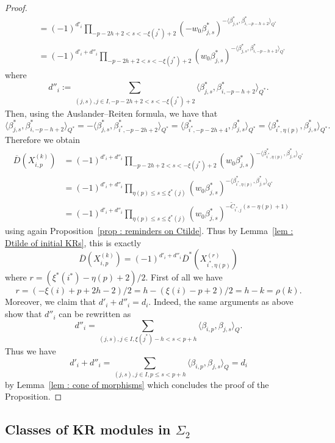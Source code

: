 \documentclass[12pt]{amsart}
\theoremstyle{plain}
\theoremstyle{definition}
\numberwithin{equation}{section}
\newcommand{\barD}{\overline{D}}
\newcommand{\barDstar}{\overline{D}^{*}}
\begin{document}
\begin{proof}
\begin{align*}
  &= (-1)^{d'_i} \prod_{-p-2h+2<s<-\xi(j^{*})+2} \left( - w_0 \beta_{j,s}^{*} \right)^{- \langle   \beta_{j,s}^{*} , \beta_{i,-p-h+2}^{*} \rangle_{Q^{*}} } \\
  &=  (-1)^{d'_i+d''_i} \prod_{-p-2h+2<s<-\xi(j^{*})+2} \left( w_0 \beta_{j,s}^{*} \right)^{- \langle   \beta_{j,s}^{*} , \beta_{i,-p-h+2}^{*} \rangle_{Q^{*}} }
  \end{align*}
  where 
  $$ d''_i := \sum_{(j,s) , j \in I ,-p-2h+2<s<-\xi(j^{*})+2} \langle   \beta_{j,s}^{*} , \beta_{i,-p-h+2}^{*} \rangle_{Q^{*}} .  $$
  Then, using the Auslander--Reiten formula, we have that 
  $$\langle \beta_{j,s}^{*} , \beta_{i,-p-h+2}^{*} \rangle_{Q^{*}} = - \langle   \beta_{j,s}^{*} , \beta_{i^{*},-p-2h+2}^{*} \rangle_{Q^{*}}  = \langle  \beta_{i^{*},-p-2h+4}^{*} , \beta_{j,s}^{*} \rangle_{Q^{*}} = \langle \beta_{i^{*},\eta(p)}^{*} , \beta_{j,s}^{*} \rangle_{Q^{*}} . $$
  Therefore we obtain 
 \begin{align*}
\barD \left( X_{i,p}^{(k)} \right) &= (-1)^{d'_i+d''_i} \prod_{-p-2h+2<s<-\xi(j^{*})+2} \left( w_0 \beta_{j,s}^{*} \right)^{-\langle \beta_{i^{*},\eta(p)}^{*} , \beta_{j,s}^{*} \rangle_{Q^{*}}} \\
&= (-1)^{d'_i + d''_i} \prod_{\eta(p)  \leq s \leq \xi^{*}(j)} \left( w_0 \beta_{j,s}^{*} \right)^{-\langle \beta_{i^{*},\eta(p)}^{*} , \beta_{j,s}^{*} \rangle_{Q^{*}}} \\
&= (-1)^{d'_i + d''_i} \prod_{\eta(p)  \leq s \leq \xi^{*}(j)} \left( w_0 \beta_{j,s}^{*} \right)^{ -\tilde{C}_{i^{*},j}(s-\eta(p)+1)} 
\end{align*}
using again Proposition~\ref{prop : reminders on Ctilde}. Thus by Lemma~\ref{lem : Dtilde of initial KRs}, this is exactly 
$$\barD \left( X_{i,p}^{(k)} \right) = (-1)^{d'_i + d''_i} \barDstar \left(  X_{i^{*} , \eta(p)}^{(r)}   \right)  $$
where $r = (\xi^{*}(i^{*})-\eta(p)+2)/2$. First of all we have 
$$ r= (-\xi(i)+p+2h-2)/2 = h- (\xi(i)-p+2)/2 = h-k = \rho(k) . $$
Moreover, we claim that $d'_i+d''_i = d_i$. Indeed, the same arguments as above show that $d''_i$ can be rewritten as 
$$ d''_i = \sum_{(j,s) , j \in I , \xi(j^{*})-h < s < p+h} \langle \beta_{i,p} , \beta_{j,s} \rangle_Q .   $$
Thus we have 
$$ d'_i + d''_i = \sum_{(j,s) , j \in I , p \leq s < p+h} \langle \beta_{i,p} , \beta_{j,s} \rangle_Q = d_i $$
 by Lemma~\ref{lem : cone of morphisms} which concludes the proof of the Proposition. 
\end{proof}


    
\subsection{Classes of KR modules in \texorpdfstring{$\Sigma_2$}{Sigma2}} \label{sec : KR whose deg is h}
\end{document}
